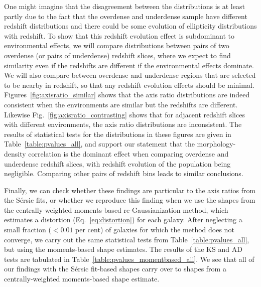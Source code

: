 \documentclass[twocolumn,useAMS,usenatbib]{mn2e}
\newcommand{\sersic}{S\'{e}rsic }
\begin{document}
One might imagine that the disagreement between the distributions is
at least partly due to the fact that the overdense and underdense
sample have different redshift distributions and there could be some
evolution of ellipticity distributions with redshift. 
To show that this redshift evolution effect is subdominant to
environmental effects, we will compare distributions between pairs of
two overdense (or pairs of underdense) redshift slices, where we
expect to find similarity even if the redshifts are different if the
environmental effects dominate.  We will also compare between
overdense and underdense regions that are selected to be nearby in
redshift, so that any redshift evolution effects should be minimal. 
Figures~\ref{fig:axisratio_similar}
shows that the axis ratio
distributions are indeed consistent when the environments are similar
but the redshifts are different.  Likewise
Fig.~\ref{fig:axisratio_contrasting} shows that for adjacent redshift
slices with different environments, the axis ratio distributions are
inconsistent.  The results of statistical tests for the distributions
in these figures are given in Table~\ref{table:pvalues_all}, and
support our statement that the morphology-density
correlation is the dominant effect when comparing overdense and
underdense redshift slices, with redshift evolution of the
population being negligible. 
Comparing other pairs of redshift
bins leads to similar conclusions. 

Finally, we can check whether these findings are particular to the
axis ratios from the \sersic fits, or whether we reproduce this
finding when we use the shapes from the centrally-weighted
moments-based re-Gaussianization method, which estimates a distortion
(Eq.~\ref{eq:distortion}) for each galaxy. 
After neglecting a small fraction ($<0.01$ per cent) of galaxies for
which the method does not converge, 
we carry out the same statistical tests from
Table~\ref{table:pvalues_all}, but using the moments-based shape
estimates.  The results of the KS and AD tests are tabulated in Table~\ref{table:pvalues_momentbased_all}.
We see that all of our findings with the \sersic fit-based shapes
carry over to shapes from a centrally-weighted moments-based shape
estimate.
\end{document}
